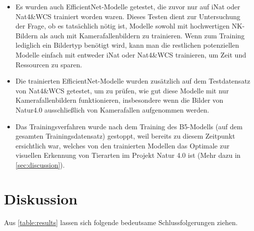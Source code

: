 \begin{itemize}
	\item Es wurden auch EfficientNet-Modelle getestet, die zuvor nur auf iNat oder Nat4\&WCS trainiert worden waren. Dieses Testen dient zur Untersuchung der Frage, ob es tatsächlich nötig ist, Modelle sowohl mit hochwertigen NK-Bildern als auch mit Kamerafallenbildern zu trainieren. Wenn zum Training lediglich ein Bildertyp benötigt wird, kann man die restlichen potenziellen Modelle einfach mit entweder iNat oder Nat4\&WCS trainieren, um Zeit und Ressourcen zu sparen.
	
	\item Die trainierten EfficientNet-Modelle wurden zusätzlich auf dem Testdatensatz von Nat4\&WCS getestet, um zu prüfen, wie gut diese Modelle mit nur Kamerafallenbildern funktionieren, insbesondere wenn die Bilder von Natur4.0 ausschließlich von Kamerafallen aufgenommen werden.
	
	\item Das Trainingsverfahren wurde nach dem Training des B5-Modells (auf dem gesamten Trainingsdatensatz) gestoppt, weil bereits zu diesem Zeitpunkt ersichtlich war, welches von den trainierten Modellen das Optimale zur visuellen Erkennung von Tierarten im Projekt Natur 4.0 ist (Mehr dazu in \autoref{sec:discussion}).
\end{itemize}

\section{Diskussion} \label{sec:discussion}

Aus \autoref{table:results} lassen sich folgende bedeutsame Schlussfolgerungen ziehen.

